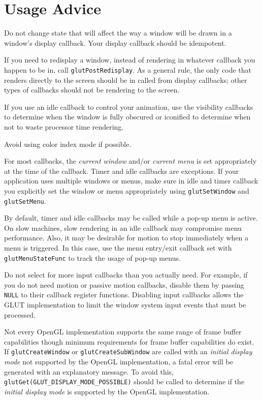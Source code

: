 \section{Usage Advice}

Do not change state that will affect the way a window
will be drawn in a window's display callback.
Your display callback should be idempotent.

If you need to redisplay a window, instead of rendering in
whatever callback you happen to be in, call {\tt glutPostRedisplay}.
As a general rule, the only code that renders directly to the screen
should be in called from display callbacks; other types of callbacks
should not be rendering to the screen.

If you use an idle callback to control your animation, use the
visibility callbacks to determine when the window is fully obscured
or iconified to determine when not to waste processor time rendering.

Avoid using color index mode if possible.

For most callbacks, the {\em current window} and/or {\em current menu} is
set appropriately at the time of the callback.  Timer and idle callbacks
are exceptions.  If your application uses multiple windows or menus,
make sure in idle and timer callback you explicitly set the
window or menu appropriately using {\tt glutSetWindow} and {\tt
glutSetMenu}.

By default, timer and idle callbacks may be called while a
pop-up menu is active.  On slow machines, slow rendering in an idle
callback may compromise menu performance.  Also, it may be desirable
for motion to stop immediately when a menu is triggered.  In this
case, use the menu entry/exit callback set with {\tt glutMenuStateFunc}
to track the usage of pop-up menus.

Do not select for more input callbacks than you actually
need.  For example, if you do not need motion or passive motion
callbacks, disable them by passing {\tt NULL} to their callback
register functions.  Disabling input callbacks allows the GLUT
implementation to limit the window system input events that must
be processed.

Not every OpenGL implementation supports the same range of
frame buffer capabilities though minimum requirements for
frame buffer capabilities do exist.  If {\tt glutCreateWindow}
or {\tt glutCreateSubWindow} are called with an {\em initial
display mode} not supported by the OpenGL implementation,
a fatal error will be generated with an explanatory message.
To avoid this, {\tt glutGet(GLUT\_DISPLAY\_MODE\_POSSIBLE)}
should be called to determine if the {\em initial
display mode} is supported by the OpenGL implementation.

